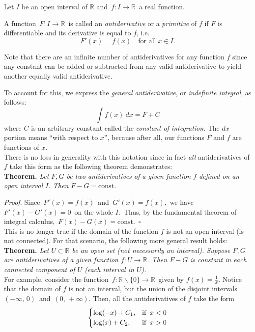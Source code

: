 \documentclass[12pt]{article}
\begin{document}
Let $I$ be an open interval of $\mathbb{R}$ and\, $f:I \longrightarrow \mathbb{R}$\, a real function.

A function \,$F:I \longrightarrow \mathbb{R}$\, is called an \emph{antiderivative} or a \emph{primitive} of $f$ if $F$ is differentiable and its derivative is equal to $f$, i.e.
\begin{displaymath}
 F'(x) = f(x) \quad \text{for all}\; x \in I.
\end{displaymath}

Note that there are an infinite number of antiderivatives for any function $f$ since any constant can be added or subtracted from any valid antiderivative to yield another equally valid antiderivative.

To account for this, we express the \emph{general antiderivative}, or \emph{indefinite integral}, as follows:
$$ \int f(x)\ dx = F+C$$
where $C$ is an arbitrary constant called the \emph{constant of integration}.  The $dx$ portion means ``with respect to $x$'', because after all, our functions $F$ and $f$ are functions of $x$.\\

There is no loss in generality with this notation since in fact \emph{all} antiderivatives of $f$ take this form as the following theorem demonstrates:\\

{\bf Theorem.}  \emph{Let $F, G$ be two antiderivatives of a given function $f$ defined on an open interval $I$. Then $F-G = \textrm{const}$.}

\emph{Proof.}  Since\, $F'(x) = f(x)$\, and\, $G'(x) = f(x)$,\, we have\, $F'(x)-G'(x) = 0$\, on the whole $I$.\, Thus, by the fundamental theorem of integral calculus,\, $F(x)-G(x) = \textrm{const}$.\, $\square$\\

This is no longer true if the domain of the function $f$ is not an open interval (is not connected).  For that scenario, the following more general result holds:\\

{\bf Theorem.}  \emph{Let $U \subset \mathbb{R}$ be an open set (not necessarily an interval).  Suppose $F, G$ are antiderivatives of a given function $f:U \longrightarrow \mathbb{R}$.  Then $F-G$ is constant in each connected component of $U$ (each interval in $U$).}\\

For example, consider the function \,$f:\mathbb{R}\!\smallsetminus\!\{0\} \longrightarrow \mathbb{R}$\, given by $f(x) = \frac{1}{x}$. Notice that the domain of $f$ is not an interval, but the union of the disjoint intervals \,$(-\infty,\, 0)$\, and \,$(0,\,+\infty)$.  Then, all the antiderivatives of $f$ take the form
\begin{displaymath}
\begin{cases}
\log(-x) + C_1, & $if$\;\; x < 0\\
\log(x) + C_2, & $if$\;\; x > 0
\end{cases}
\end{displaymath}
\end{document}
